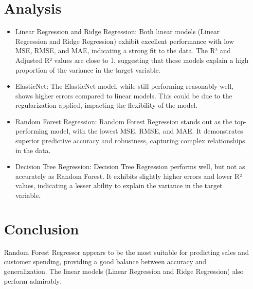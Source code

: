 \section{Analysis}
\begin{itemize}
\item Linear Regression and Ridge Regression:
\newline
Both linear models (Linear Regression and Ridge Regression) exhibit excellent performance with low MSE, RMSE, and MAE, indicating a strong fit to the data.
The R² and Adjusted R² values are close to 1, suggesting that these models explain a high proportion of the variance in the target variable.
\item ElasticNet:
\newline
The ElasticNet model, while still performing reasonably well, shows higher errors compared to linear models. This could be due to the regularization applied, impacting the flexibility of the model.
\item Random Forest Regression:
\newline 
Random Forest Regression stands out as the top-performing model, with the lowest MSE, RMSE, and MAE. It demonstrates superior predictive accuracy and robustness, capturing complex relationships in the data.
\item Decision Tree Regression:
\newline
Decision Tree Regression performs well, but not as accurately as Random Forest. It exhibits slightly higher errors and lower R² values, indicating a lesser ability to explain the variance in the target variable.
\end{itemize}

\section{Conclusion}

Random Forest Regressor appears to be the most suitable for predicting sales and customer spending, providing a good balance between accuracy and generalization. The linear models (Linear Regression and Ridge Regression) also perform admirably. 










